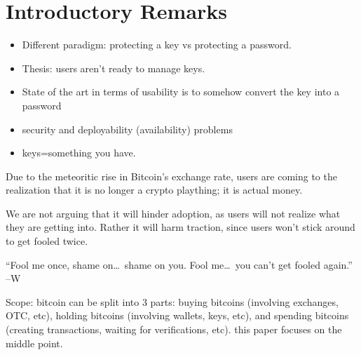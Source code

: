 
\section{Introductory Remarks}



\begin{itemize}
\item Different paradigm: protecting a key vs protecting a password. 
\item Thesis: users aren't ready to manage keys. 
\item State of the art in terms of usability is to somehow convert the key into a password
\item security and deployability (availability) problems
\item keys=something you have. 
\end{itemize}





Due to the meteoritic rise in Bitcoin's exchange rate, users are coming to the realization that it is no longer a crypto plaything; it is actual money. 


We are not arguing that it will hinder adoption, as users will not realize what they are getting into. Rather it will harm traction, since users won't stick around to get fooled twice. 

``Fool me once, shame on\ldots~shame on you. Fool me\ldots~you can't get fooled again.'' --W

Scope: bitcoin can be split into 3 parts: buying bitcoins (involving exchanges, OTC, etc), holding bitcoins (involving wallets, keys, etc), and spending bitcoins (creating transactions, waiting for verifications, etc). this paper focuses on the middle point. 
